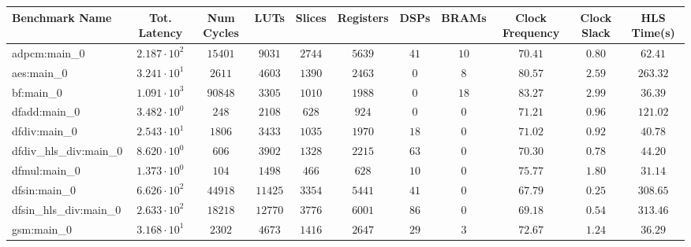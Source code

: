 \begin{tabular}{|l|c|c|c|c|c|c|c|c|c|c|}
\hline
Benchmark Name          & Tot. Latency           & Num Cycles & LUTs      & Slices    & Registers & DSPs    & BRAMs   & Clock Frequency & Clock Slack & HLS Time(s) \\
\hline
adpcm:main\_0           & $ 2.187 \cdot 10^{2} $ & $ 15401  $ & $ 9031  $ & $ 2744  $ & $ 5639  $ & $ 41  $ & $ 10  $ & $ 70.41       $ & $ 0.80    $ & $ 62.41   $ \\
aes:main\_0             & $ 3.241 \cdot 10^{1} $ & $ 2611   $ & $ 4603  $ & $ 1390  $ & $ 2463  $ & $ 0   $ & $ 8   $ & $ 80.57       $ & $ 2.59    $ & $ 263.32  $ \\
bf:main\_0              & $ 1.091 \cdot 10^{3} $ & $ 90848  $ & $ 3305  $ & $ 1010  $ & $ 1988  $ & $ 0   $ & $ 18  $ & $ 83.27       $ & $ 2.99    $ & $ 36.39   $ \\
dfadd:main\_0           & $ 3.482 \cdot 10^{0} $ & $ 248    $ & $ 2108  $ & $ 628   $ & $ 924   $ & $ 0   $ & $ 0   $ & $ 71.21       $ & $ 0.96    $ & $ 121.02  $ \\
dfdiv:main\_0           & $ 2.543 \cdot 10^{1} $ & $ 1806   $ & $ 3433  $ & $ 1035  $ & $ 1970  $ & $ 18  $ & $ 0   $ & $ 71.02       $ & $ 0.92    $ & $ 40.78   $ \\
dfdiv\_hls\_div:main\_0 & $ 8.620 \cdot 10^{0} $ & $ 606    $ & $ 3902  $ & $ 1328  $ & $ 2215  $ & $ 63  $ & $ 0   $ & $ 70.30       $ & $ 0.78    $ & $ 44.20   $ \\
dfmul:main\_0           & $ 1.373 \cdot 10^{0} $ & $ 104    $ & $ 1498  $ & $ 466   $ & $ 628   $ & $ 10  $ & $ 0   $ & $ 75.77       $ & $ 1.80    $ & $ 31.14   $ \\
dfsin:main\_0           & $ 6.626 \cdot 10^{2} $ & $ 44918  $ & $ 11425 $ & $ 3354  $ & $ 5441  $ & $ 41  $ & $ 0   $ & $ 67.79       $ & $ 0.25    $ & $ 308.65  $ \\
dfsin\_hls\_div:main\_0 & $ 2.633 \cdot 10^{2} $ & $ 18218  $ & $ 12770 $ & $ 3776  $ & $ 6001  $ & $ 86  $ & $ 0   $ & $ 69.18       $ & $ 0.54    $ & $ 313.46  $ \\
gsm:main\_0             & $ 3.168 \cdot 10^{1} $ & $ 2302   $ & $ 4673  $ & $ 1416  $ & $ 2647  $ & $ 29  $ & $ 3   $ & $ 72.67       $ & $ 1.24    $ & $ 36.29   $ \\

\end{tabular}
